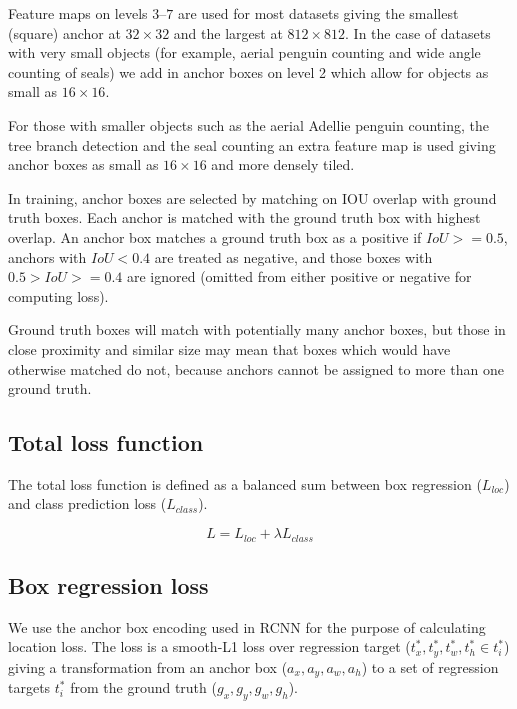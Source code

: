 Feature maps on levels $3$--$7$ are used for most datasets giving the smallest (square) anchor at $32\times32$ and the largest at $812\times812$. In the case of datasets with very small objects (for example, aerial penguin counting and wide angle counting of seals) we add in anchor boxes on level 2 which allow for objects as small as $16 \times 16$.

For those with smaller objects such as the aerial Adellie penguin counting, the tree branch detection and the seal counting an extra feature map is used giving anchor boxes as small as $16\times16$ and more densely tiled.

In training, anchor boxes are selected by matching on \gls{IOU} overlap with ground truth boxes. Each anchor is matched with the ground truth box with highest overlap. An anchor box matches a ground truth box as a positive if $ IoU >= 0.5 $, anchors with $ IoU < 0.4 $ are treated as negative, and those boxes with $ 0.5 > IoU >= 0.4 $ are ignored (omitted from either positive or negative for computing loss).

Ground truth boxes will match with potentially many anchor boxes, but those in close proximity and similar size may mean that boxes which would have otherwise matched do not, because anchors cannot be assigned to more than one ground truth.

\subsection{Total loss function}

The total loss function is defined as a balanced sum between box regression ($L_{loc}$) and class prediction loss ($L_{class}$). 

\begin{equation}
L  = L_{loc} + \lambda L_{class}
\label{eq:loss_total}
\end{equation}

\subsection {Box regression loss}
\label{sec:regression}


We use the anchor box encoding used in \gls{RCNN} \cite{Wang2017} for the purpose of calculating location loss. The loss is a smooth-L1 loss over regression target ($t^*_x, t^*_y, t^*_w, t^*_h \in t^*_i$) giving a transformation from an anchor box ($a_x, a_y, a_w, a_h$)  to a set of regression targets $t^*_i$ from the ground truth ($g_x, g_y, g_w, g_h$). 

